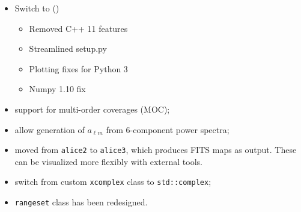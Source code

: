 \documentclass[12pt,twoside]{article}
\begin{document}
{{\begin{itemize}
	\item Switch to 
	()
	\begin{itemize}
	\item Removed C++ 11 features%
    	\item Streamlined setup.py%
    	\item Plotting fixes for Python 3%
    	\item Numpy 1.10 fix%
	\end{itemize}
	\end{itemize}




\begin{itemize}
\item support for multi-order coverages (MOC);
\item allow generation of $a_{\ell m}$ from 6-component power spectra;
\item moved from \texttt{alice2} to \texttt{alice3}, which produces FITS \healpix maps as output.
 These can be visualized more flexibly with external tools.
\item switch from custom \texttt{xcomplex} class to \texttt{std::complex};
\item \texttt{rangeset} class has been redesigned.
\end{itemize}


}}
\end{document}
